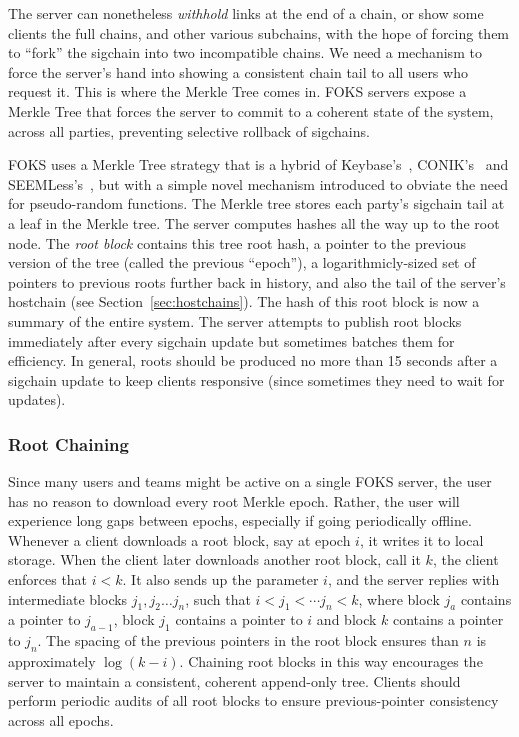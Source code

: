 The server can nonetheless \textit{withhold} links at the end of a chain, 
or show some clients the full chains, and other various subchains, with the
hope of forcing them to ``fork'' the sigchain into two incompatible chains.
We need a mechanism to force the server's hand into showing a consistent 
chain tail to all users who request it. This is where the Merkle Tree
comes in. FOKS servers expose a Merkle Tree that forces the server to commit
to a coherent state of the system, across all parties, preventing selective
rollback of sigchains. 

FOKS uses a Merkle Tree strategy that is a hybrid of Keybase's~\cite{keybase},
CONIK's~\cite{melara2015coniks} and SEEMLess's~\cite{chase2019seemless}, but
with a simple novel mechanism introduced to obviate the need for pseudo-random
functions. The Merkle tree stores each party's sigchain tail at a leaf 
in the Merkle tree. The server computes hashes all the way up to the root node.
The \textit{root block} contains this tree root hash, a pointer to the previous version of
the tree (called the previous ``epoch''), a logarithmicly-sized set of pointers
to previous roots further back in history, and also the tail of the 
server's hostchain (see Section~\ref{sec:hostchains}). The hash of this
root block is now a summary of the entire system. The server attempts to publish
root blocks immediately after every sigchain update but sometimes batches 
them for efficiency. In general, roots should be produced no more than
15 seconds after a sigchain update to keep clients responsive (since sometimes
they need to wait for updates).

\subsubsection{Root Chaining}

Since many users and teams might be active on a single FOKS server, 
the user has no reason to download every root Merkle epoch. Rather,
the user will experience long gaps between epochs, especially if going
periodically offline. Whenever a client downloads a root block,
say at epoch $i$, it writes it to local storage. When the client later
downloads another root block, call it $k$, the client enforces
that $i < k$. It also sends up the parameter $i$, and the server
replies with intermediate blocks $j_1, j_2 \dots j_n$, such that
$i < j_1 < \cdots j_n < k$,  where block $j_{a}$ contains
a pointer to $j_{a-1}$, block $j_1$ contains a pointer to $i$
and block $k$ contains a pointer to $j_n$. The spacing of the
previous pointers in the root block ensures than $n$ is approximately
$\log (k-i)$. Chaining root blocks in this way 
encourages the server to maintain a consistent, coherent append-only
tree. Clients should perform periodic audits of all root blocks
to ensure previous-pointer consistency across all epochs.

